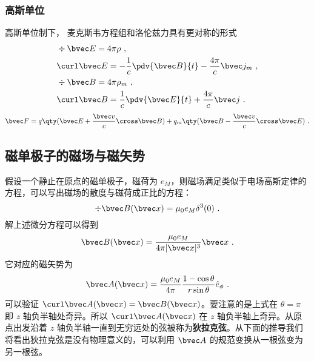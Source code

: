 \subsubsection{高斯单位}
高斯单位制下， 麦克斯韦方程组和洛伦兹力具有更对称的形式
\begin{equation}\label{eq_BMono_1}
\begin{aligned}
&\div \bvec E = 4\pi\rho~,\\
&\curl \bvec E = -\frac{1}{c}\pdv{\bvec B}{t}  - \frac{4\pi}{c}\bvec j_m~,\\
&\div \bvec B = 4\pi\rho_m~,\\
&\curl \bvec B = \frac{1}{c}\pdv{\bvec E}{t} + \frac{4\pi}{c} \bvec j~.
\end{aligned}
\end{equation}
\begin{equation}
\bvec F = q \qty(\bvec E + \frac{\bvec v}{c}\cross \bvec B) + q_m \qty(\bvec B - \frac{\bvec v}{c}\cross \bvec E)~.
\end{equation}

\subsection{磁单极子的磁场与磁矢势}
假设一个静止在原点的磁单极子，磁荷为 $e_M$，则磁场满足类似于电场高斯定律的方程，可以写出磁场的散度与磁荷成正比的方程：
\begin{equation}\label{eq_BMono_4}
\div \bvec B(\bvec x)=\mu_0 e_M\delta^3(0)~.
\end{equation}
解上述微分方程可以得到
\begin{equation}
\bvec B(\bvec x)=\frac{\mu_0 e_M}{4\pi |\bvec x|^3}\bvec x~.
\end{equation}
它对应的磁矢势为
\begin{equation}\label{eq_BMono_5}
\bvec A(\bvec x)=\frac{\mu_0 e_M}{4\pi } \frac{1-\cos\theta}{r\sin\theta} \hat e_\phi~.
\end{equation}
可以验证 $\curl \bvec A(\bvec x) = \bvec B(\bvec x)$。要注意的是上式在 $\theta=\pi$ 即 $z$ 轴负半轴处奇异。所以 $\curl \bvec A(\bvec x)$ 在 $z$ 轴负半轴上奇异。从原点出发沿着 $z$ 轴负半轴一直到无穷远处的弦被称为\textbf{狄拉克弦}。从下面的推导我们将看出狄拉克弦是没有物理意义的，可以利用 $\bvec A$ 的规范变换从一根弦变为另一根弦。
